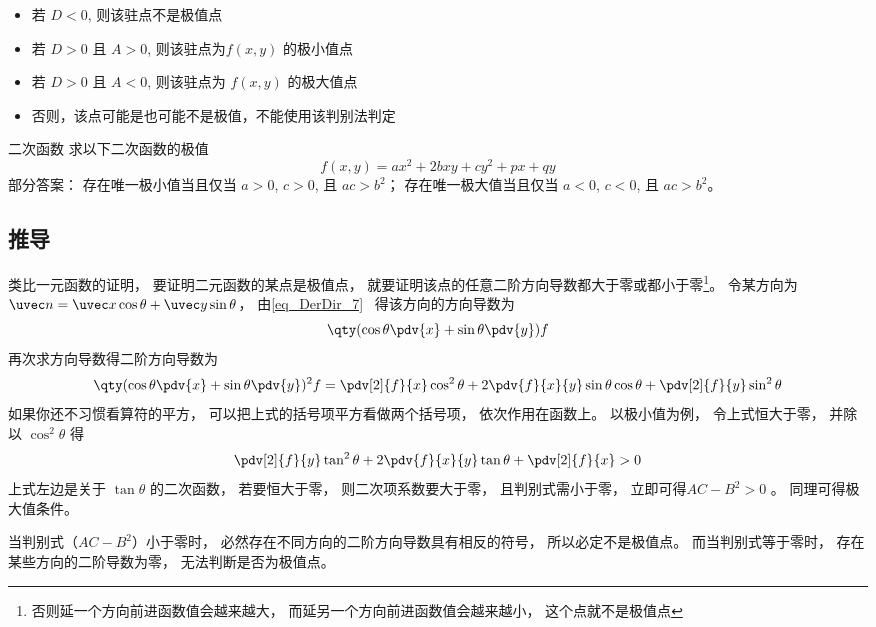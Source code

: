 \begin{itemize}
\item 若 $D<0$, 则该驻点不是极值点
\item 若 $D>0$ 且 $A>0$, 则该驻点为$f(x,y)$ 的极小值点
\item 若 $D>0$ 且 $A<0$, 则该驻点为 $f(x,y)$ 的极大值点
\item 否则，该点可能是也可能不是极值，不能使用该判别法判定
\end{itemize}

\begin{exercise}{二次函数}
求以下二次函数的极值
\begin{equation}
f(x, y) = ax^2 + 2bxy + cy^2 + px + qy
\end{equation}
部分答案： 存在唯一极小值当且仅当 $a>0$, $c>0$, 且 $ac>b^2$； 存在唯一极大值当且仅当 $a<0$, $c<0$, 且 $ac>b^2$。
\end{exercise}

\subsection{推导}

类比一元函数的证明， 要证明二元函数的某点是极值点， 就要证明该点的任意二阶方向导数都大于零或都小于零\footnote{否则延一个方向前进函数值会越来越大， 而延另一个方向前进函数值会越来越小， 这个点就不是极值点}。 令某方向为 $\uvec n = \uvec x \cos\theta + \uvec y \sin\theta$， 由\autoref{eq_DerDir_7}~ 得该方向的方向导数为
\begin{equation}
\qty(\cos\theta\pdv{x} + \sin\theta\pdv{y}) f
\end{equation}
再次求方向导数得二阶方向导数为
\begin{equation}
\qty(\cos\theta\pdv{x} + \sin\theta\pdv{y})^2 f
= \pdv[2]{f}{x} \cos^2\theta + 2\pdv{f}{x}{y} \sin\theta\cos\theta + \pdv[2]{f}{y} \sin^2\theta
\end{equation}
如果你还不习惯看算符的平方， 可以把上式的括号项平方看做两个括号项， 依次作用在函数上。 以极小值为例， 令上式恒大于零， 并除以 $\cos^2\theta$ 得
\begin{equation}
\pdv[2]{f}{y} \tan^2\theta + 2\pdv{f}{x}{y} \tan\theta + \pdv[2]{f}{x} > 0
\end{equation}
上式左边是关于 $\tan\theta$ 的二次函数， 若要恒大于零， 则二次项系数要大于零， 且判别式需小于零， 立即可得$AC-B^2>0$ 。 同理可得极大值条件。

当判别式（$AC-B^2$）小于零时， 必然存在不同方向的二阶方向导数具有相反的符号， 所以必定不是极值点。 而当判别式等于零时， 存在某些方向的二阶导数为零， 无法判断是否为极值点。


